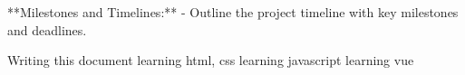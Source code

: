**Milestones and Timelines:**
    - Outline the project timeline with key milestones and deadlines.

Writing this document 
learning html, css
learning javascript
learning vue